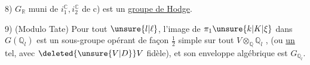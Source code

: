 
8) $G_{\mathbb R}$ muni de $i_1^{\mathbb C},i_2^{\mathbb C}$ de c) est un \uline{groupe de Hodge}.

9) (Modulo Tate) Pour tout $\unsure{l|\ell}$, l'image de $\pi_1\unsure{k|K|\xi}$ dans $G(\mathbb Q_l)$ est un sous-groupe opérant de façon $\frac12$ simple sur tout  $V\otimes_{\mathbb Q}\mathbb Q_l$ , (ou \uline{un} tel, avec $\deleted{\unsure{V|D}}V$  fidèle), et son enveloppe algébrique est $G_{\mathbb Q_l}$.


{\centering \textsc{ }\\
\textit{ }\par}
